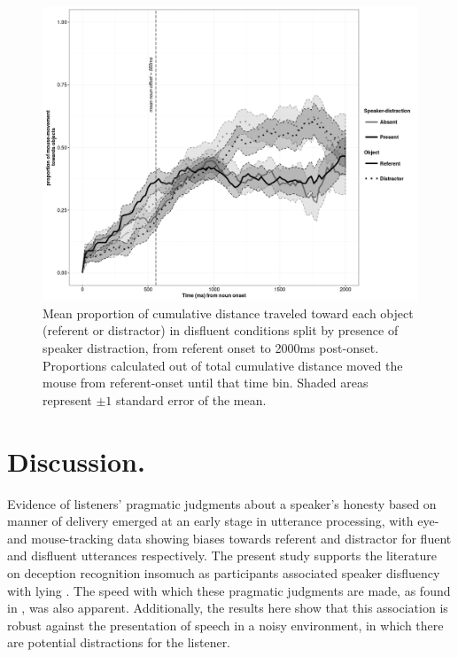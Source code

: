 \documentclass[a4paper,man,natbib]{apa6}
\begin{document}
\begin{figure}[Ht]
  \centering
	\includegraphics[scale=.5]{mdisfl.png}
  \caption{Mean proportion of cumulative distance traveled toward each object (referent or distractor) in disfluent conditions split by presence of speaker distraction, from referent onset to 2000ms post-onset. Proportions calculated out of total cumulative distance moved the mouse from referent-onset until that time bin. Shaded areas represent $\pm 1$ standard error of the mean.}
  \label{fig:mdis}
\end{figure}


\section{Discussion.}
Evidence of listeners' pragmatic judgments about a speaker's honesty based on manner of delivery emerged at an early stage in utterance processing, with eye- and mouse-tracking data showing biases towards referent and distractor for fluent and disfluent utterances respectively.
The present study supports the literature on deception recognition insomuch as participants associated speaker disfluency with lying \citep{Zuckerman1981,depaulo2003cues}. 
The speed with which these pragmatic judgments are made, as found in \citet{Loy2016}, was also apparent.
Additionally, the results here show that this association is robust against the presentation of speech in a noisy environment, in which there are potential distractions for the listener. 
\end{document}
